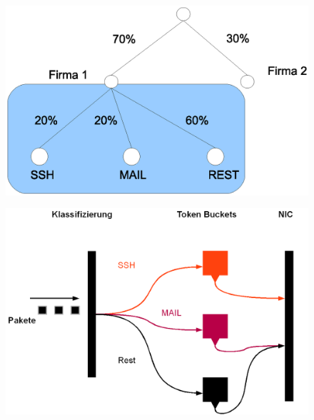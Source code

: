 \documentclass[14pt]{beamer}
\begin{document}
\begin{frame}
\begin{figure}[h!]
      \includegraphics[width=1\textwidth]{GFX/bucket-hiracy-menge}
  \end{figure}
\end{frame}


\begin{frame}
\begin{figure}[h!]
      \includegraphics[width=1\textwidth]{GFX/htb-classification}
  \end{figure}
\end{frame}
\end{document}
